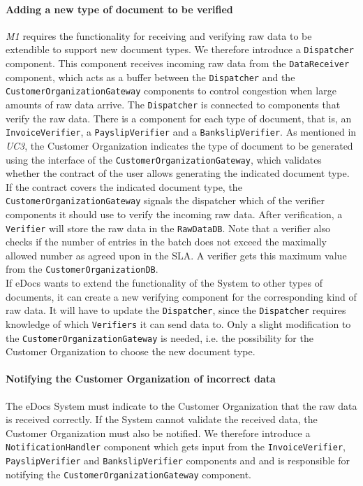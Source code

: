 \documentclass[a4paper,10pt]{article}
\begin{document}
\paragraph{Adding a new type of document to be verified} \emph{M1} requires the functionality for receiving and verifying raw data to be extendible to support new document types. We therefore introduce a \texttt{Dispatcher} component. This component receives incoming raw data from the \texttt{DataReceiver} component, which acts as a buffer between the \texttt{Dispatcher} and the \texttt{CustomerOrganizationGateway} components to control congestion when large amounts of raw data arrive. The \texttt{Dispatcher} is connected to components that verify the raw data. There is a component for each type of document, that is, an \texttt{InvoiceVerifier}, a \texttt{PayslipVerifier} and a \texttt{BankslipVerifier}. As mentioned in \emph{UC3}, the Customer Organization indicates the type of document to be generated using the interface of the \texttt{CustomerOrganizationGateway}, which validates whether the contract of the user allows generating the indicated document type. If the contract covers the indicated document type, the \texttt{CustomerOrganizationGateway} signals the dispatcher which of the verifier components it should use to verify the incoming raw data. After verification, a \texttt{Verifier} will store the raw data in the \texttt{RawDataDB}. Note that a verifier also checks if the number of entries in the batch does not exceed the maximally allowed number as agreed upon in the SLA. A verifier gets this maximum value from the \texttt{CustomerOrganizationDB}.\\

If eDocs wants to extend the functionality  of the System to other types of documents, it can create a new verifying component for the corresponding kind of raw data. It will have to update the \texttt{Dispatcher}, since the \texttt{Dispatcher} requires knowledge of which \texttt{Verifiers} it can send data to. Only a slight modification to the \texttt{CustomerOrganizationGateway} is needed, i.e. the possibility for the Customer Organization to choose the new document type.

\paragraph{Notifying the Customer Organization of incorrect data}
The eDocs System must indicate to the Customer Organization that the raw data is received correctly. If the System cannot validate the received data, the Customer Organization must also be notified. We therefore introduce a \texttt{NotificationHandler} component which gets input from the \texttt{InvoiceVerifier}, \texttt{PayslipVerifier} and \texttt{BankslipVerifier} components and and is responsible for notifying the \texttt{CustomerOrganizationGateway} component.
\end{document}
